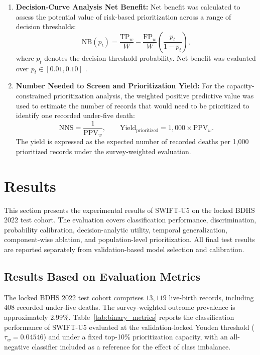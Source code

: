 \documentclass[a4paper,fleqn]{cas-sc}
\begin{document}
\begin{enumerate}
    \item \textbf{Decision-Curve Analysis Net Benefit:}
    Net benefit was calculated to assess the potential value of risk-based prioritization across a range of decision thresholds:
    \begin{equation}
      \mathrm{NB}(p_t) =
      \frac{\mathrm{TP}_w}{W}
      -
      \frac{\mathrm{FP}_w}{W}
      \left(\frac{p_t}{1-p_t}\right),
    \end{equation}
    where $p_t$ denotes the decision threshold probability. Net benefit was evaluated over $p_t\in[0.01,0.10]$ \cite{vickers2006}.

    \item \textbf{Number Needed to Screen and Prioritization Yield:}
    For the capacity-constrained prioritization analysis, the weighted positive predictive value was used to estimate the number of records that would need to be prioritized to identify one recorded under-five death:
    \begin{equation}
      \mathrm{NNS} =
      \frac{1}{\mathrm{PPV}_w},
      \qquad
      \mathrm{Yield}_{\mathrm{prioritized}} =
      1{,}000\times\mathrm{PPV}_w.
    \end{equation}
    The yield is expressed as the expected number of recorded deaths per 1,000 prioritized records under the survey-weighted evaluation.
\end{enumerate}


\section{Results}
\label{sec:results}

This section presents the experimental results of SWIFT-U5 on the locked BDHS 2022 test cohort. The evaluation covers classification performance, discrimination, probability calibration, decision-analytic utility, temporal generalization, component-wise ablation, and population-level prioritization. All final test results are reported separately from validation-based model selection and calibration.

\subsection{Results Based on Evaluation Metrics}
\label{sec:res_metrics}

The locked BDHS 2022 test cohort comprises $13{,}119$ live-birth records, including 408 recorded under-five deaths. The survey-weighted outcome prevalence is approximately 2.99\%. Table~\ref{tab:binary_metrics} reports the classification performance of SWIFT-U5 evaluated at the validation-locked Youden threshold ($\tau_w=0.04546$) and under a fixed top-10\% prioritization capacity, with an all-negative classifier included as a reference for the effect of class imbalance.
\end{document}

